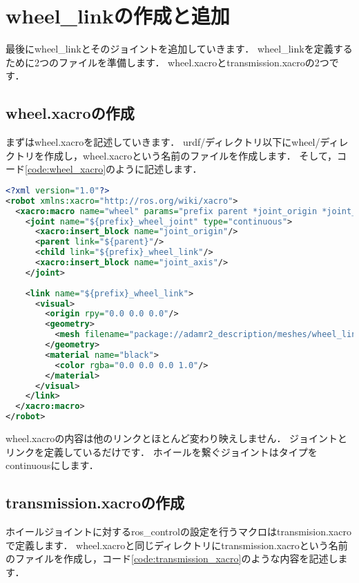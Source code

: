 \documentclass[{../../master}]{subfiles}
\begin{document}
\section{\textsf{wheel\_link}の作成と追加}

最後に\textsf{wheel\_link}とそのジョイントを追加していきます．
\textsf{wheel\_link}を定義するために2つのファイルを準備します．
\textsf{wheel.xacro}と\textsf{transmission.xacro}の2つです．

\subsection{\textsf{wheel.xacro}の作成}

まずは\textsf{wheel.xacro}を記述していきます．
\textsf{urdf/}ディレクトリ以下に\textsf{wheel/}ディレクトリを作成し，\textsf{wheel.xacro}という名前のファイルを作成します．
そして，コード\ref{code:wheel_xacro}のように記述します．

\begin{lstlisting}[language=XML, label=code:wheel_xacro, caption=\textsf{wheel.xacro}]
<?xml version="1.0"?>
<robot xmlns:xacro="http://ros.org/wiki/xacro">
  <xacro:macro name="wheel" params="prefix parent *joint_origin *joint_axis">
    <joint name="${prefix}_wheel_joint" type="continuous">
      <xacro:insert_block name="joint_origin"/>
      <parent link="${parent}"/>
      <child link="${prefix}_wheel_link"/>
      <xacro:insert_block name="joint_axis"/>
    </joint>
    
    <link name="${prefix}_wheel_link">
      <visual>
        <origin rpy="0.0 0.0 0.0"/>
        <geometry>
          <mesh filename="package://adamr2_description/meshes/wheel_link.STL"/>
        </geometry>
        <material name="black">
          <color rgba="0.0 0.0 0.0 1.0"/>
        </material>
      </visual>
    </link>
  </xacro:macro>
</robot>
\end{lstlisting}

\textsf{wheel.xacro}の内容は他のリンクとほとんど変わり映えしません．
ジョイントとリンクを定義しているだけです．
ホイールを繋ぐジョイントはタイプを\textsf{continuous}にします．

\subsection{\textsf{transmission.xacro}の作成}

ホイールジョイントに対する\textsf{ros\_control}の設定を行うマクロは\textsf{transmision.xacro}で定義します．
\textsf{wheel.xacro}と同じディレクトリに\textsf{transmission.xacro}という名前のファイルを作成し，コード\ref{code:transmission_xacro}のような内容を記述します．
\end{document}
